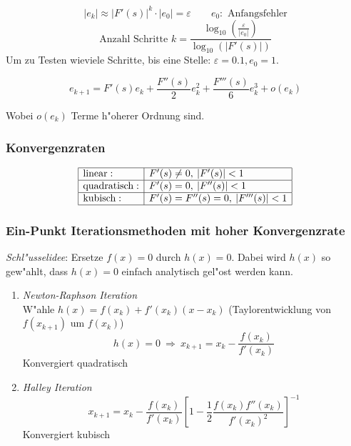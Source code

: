\documentclass[german, 10pt, a4paper, twocolumn]{scrartcl}
\begin{document}
\begin{displaymath}
	| e_k | \approx |F'(s)|^k \cdotp |e_0| = \varepsilon \qquad e_0: \mbox{ Anfangsfehler}
\end{displaymath}
\begin{displaymath}
	\mbox{Anzahl Schritte } k = \frac{\log_{10}(\frac{\varepsilon}{|e_0|})}{\log_{10}(|F'(s)|)}
\end{displaymath}
Um zu Testen wieviele Schritte, bis eine Stelle: $\varepsilon=0.1, e_0=1$.

\begin{displaymath}
	e_{k+1} = F'(s)e_k +\frac{F''(s)}{2} e_k^2 + \frac{F'''(s)}{6}e_k^3 + o(e_k)
\end{displaymath}

Wobei $o(e_k)$ Terme h"oherer Ordnung sind.

\subsubsection{Konvergenzraten}

\begin{displaymath}
\begin{array}{|l|l|}
	\hline
	\mbox{linear}: &		F'(s)\neq 0,\: |F'(s)|<1 \\ \hline
	\mbox{quadratisch}: &		F'(s)= 0,\: |F''(s)|<1 \\ \hline
	\mbox{kubisch}: &		F'(s)= F''(s)=0,\: |F'''(s)|<1 \\ \hline
\end{array}
\end{displaymath}

\subsubsection{Ein-Punkt Iterationsmethoden mit hoher Konvergenzrate}

\textit{Schl"usselidee}: Ersetze $f(x)=0$ durch $h(x)=0$. Dabei wird $h(x)$ so gew"ahlt, dass $h(x)=0$ einfach analytisch gel"ost werden kann.

\begin{enumerate}
	\item \textit{Newton-Raphson Iteration}\\
		W"ahle $h(x)=f(x_k)+f'(x_k)(x-x_k)$ (Taylorentwicklung von $f(x_{k+1})$ um $f(x_k)$)\\
		\begin{displaymath}
			h(x)=0\:\Rightarrow\:x_{k+1}=x_{k} -\frac{f(x_k)}{f'(x_k)}
		\end{displaymath}
		Konvergiert quadratisch
	\item \textit{Halley Iteration}\\ 
		\begin{displaymath}
			x_{k+1} = x_k -\frac{f(x_k)}{f'(x_k)}\left [ 1-\frac{1}{2}\frac{f(x_k)f''(x_k)}{f'(x_k)^2} \right ]^{-1}
		\end{displaymath}
		Konvergiert kubisch
\end{enumerate}
\end{document}
